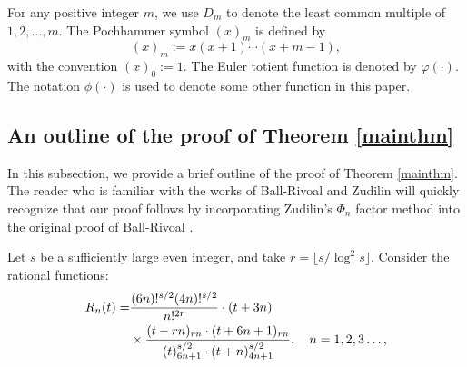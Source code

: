 \documentclass[12pt]{article}
\numberwithin{equation}{section}
\begin{document}
For any positive integer $m$, we use $D_m$ to denote the least common multiple of $1,2,\ldots,m$. The Pochhammer symbol $(x)_m$ is defined by 
\[ (x)_m := x(x+1)\cdots(x+m-1), \]
with the convention $(x)_0 := 1$. The Euler totient function is denoted by $\varphi(\cdot)$. The notation $\phi(\cdot)$ is used to denote some other function in this paper.

\bigskip

\subsection{An outline of the proof of Theorem \ref{mainthm}}
In this subsection, we provide a brief outline of the proof of Theorem \ref{mainthm}. The reader who is familiar with the works of Ball-Rivoal and Zudilin will quickly recognize that our proof follows by incorporating Zudilin's $\Phi_n$ factor method \cite{Zud2001} into the original proof of Ball-Rivoal \cite{BR2001}.

Let $s$ be a sufficiently large even integer, and take $r = \lfloor s/\log^2 s \rfloor$. Consider the rational functions:
\begin{align*}
	R_n(t) = &\frac{(6n)!^{s/2}(4n)!^{s/2}}{n!^{2r}} \cdot (t+3n) \notag\\
	& \times \frac{(t-rn)_{rn} \cdot (t+6n+1)_{rn}}{ (t)_{6n+1}^{s/2} \cdot (t+n)_{4n+1}^{s/2} }, \quad n=1,2,3\ldots, 
\end{align*}
\end{document}

